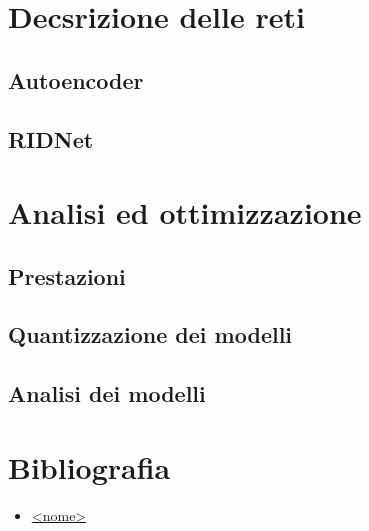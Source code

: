 \documentclass[12pt,a4paper,openright,twoside]{book}
\begin{document}
\chapter{Decsrizione delle reti}
\section{Autoencoder} 
\section{RIDNet}

\chapter{Analisi ed ottimizzazione}
\section{Prestazioni}
\section{Quantizzazione dei modelli}
\section{Analisi dei modelli}



\chapter{Bibliografia}
\begin{itemize}
    \item \href{<sito>}{<nome>}
\end{itemize}
\end{document}

